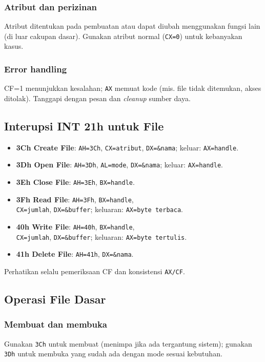 \subsubsection{Atribut dan perizinan}
Atribut ditentukan pada pembuatan atau dapat diubah menggunakan fungsi lain (di luar cakupan dasar). Gunakan atribut normal (\texttt{CX=0}) untuk kebanyakan kasus.

\subsubsection{Error handling}
CF=1 menunjukkan kesalahan; \texttt{AX} memuat kode (mis. file tidak ditemukan, akses ditolak). Tanggapi dengan pesan dan \textit{cleanup} sumber daya.

\subsection{Interupsi INT 21h untuk File}
\begin{itemize}
  \item \textbf{3Ch Create File}: \texttt{AH=3Ch}, \texttt{CX=atribut}, \texttt{DX=\&nama}; keluar: \texttt{AX=handle}.
  \item \textbf{3Dh Open File}: \texttt{AH=3Dh}, \texttt{AL=mode}, \texttt{DX=\&nama}; keluar: \texttt{AX=handle}.
  \item \textbf{3Eh Close File}: \texttt{AH=3Eh}, \texttt{BX=handle}.
  \item \textbf{3Fh Read File}: \texttt{AH=3Fh}, \texttt{BX=handle}, \\
  \texttt{CX=jumlah}, \texttt{DX=\&buffer}; keluaran: \texttt{AX=byte terbaca}.
  \item \textbf{40h Write File}: \texttt{AH=40h}, \texttt{BX=handle}, \\
  \texttt{CX=jumlah}, \texttt{DX=\&buffer}; keluaran: \texttt{AX=byte tertulis}.
  \item \textbf{41h Delete File}: \texttt{AH=41h}, \texttt{DX=\&nama}.
\end{itemize}
Perhatikan selalu pemeriksaan CF dan konsistensi \texttt{AX/CF}.

\subsection{Operasi File Dasar}
\subsubsection{Membuat dan membuka}
Gunakan \texttt{3Ch} untuk membuat (menimpa jika ada tergantung sistem); gunakan \texttt{3Dh} untuk membuka yang sudah ada dengan mode sesuai kebutuhan.


